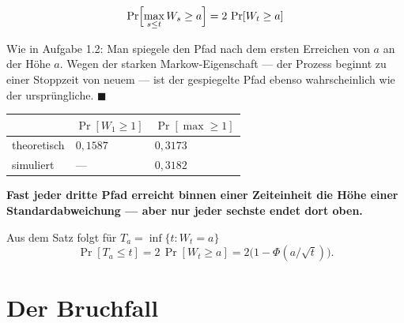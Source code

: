 \begin{merksatz}
\[ \Pr\Bigl[\max_{s\le t} W_s \ge a\Bigr] = 2\,\Pr[W_t \ge a] \]

Wie in Aufgabe 1.2: Man spiegele den Pfad nach dem ersten Erreichen von $a$ an der Höhe $a$. Wegen der starken Markow-Eigenschaft --- der Prozess beginnt zu einer Stoppzeit von neuem --- ist der gespiegelte Pfad ebenso wahrscheinlich wie der ursprüngliche. $\blacksquare$

\begin{center}
{\small
\renewcommand{\arraystretch}{1.48}
\begin{tabular}{@{}P{2.6cm}P{2.4cm}P{2.4cm}@{}}
\toprule
& $\Pr[W_1 \ge 1]$ & $\Pr[\max \ge 1]$\\
\midrule
theoretisch & $0{,}1587$ & $0{,}3173$\\
simuliert & --- & $0{,}3182$\\
\bottomrule
\end{tabular}}
\end{center}

\begin{center}
\begin{minipage}{0.9\textwidth}
\textbf{Fast jeder dritte Pfad erreicht binnen einer Zeiteinheit die Höhe einer Standardabweichung --- aber nur jeder sechste endet dort oben.}
\end{minipage}
\end{center}

Aus dem Satz folgt für $T_a = \inf\{t : W_t = a\}$
\[ \Pr[T_a \le t] = 2\,\Pr[W_t \ge a] = 2\bigl(1-\Phi(a/\sqrt t)\bigr) . \]

\begin{center}
\begin{minipage}{0.88\textwidth}
\end{minipage}
\end{center}
\end{merksatz}

\section{Der Bruchfall}

